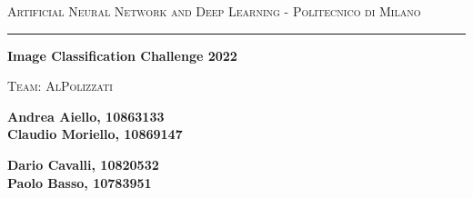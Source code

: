 \begin{center}
    \textsc{\large Artificial Neural Network and Deep Learning - Politecnico di Milano}
    \rule{\linewidth}{0.2mm}
    
    \vspace{0.5cm}

    {\huge \bfseries Image Classification Challenge 2022}

    \vspace{0.5cm}
    \textsc{\Large Team: AlPolizzati}
    \vspace{0.5cm}
    
    \large
    \begin{minipage}[t]{.4\textwidth}
        \raggedright
        \textbf{Andrea Aiello, 10863133}\\
    \textbf{Claudio Moriello, 10869147}\\
    \end{minipage}
    \begin{minipage}[t]{.4\textwidth}
        \raggedleft
        \textbf{Dario Cavalli, 10820532}\\
        \textbf{Paolo Basso, 10783951}\\
    \end{minipage}
\end{center}
